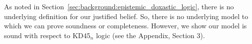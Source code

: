 As noted in Section~\ref{sec:background:epistemic_doxastic_logic}, there is no underlying definition for our justified belief. 
So, there is no underlying model to which we can prove soundness or completeness.
However, we show our model is sound with respect to KD45$_n$ logic (see the Appendix, Section 3).









    
